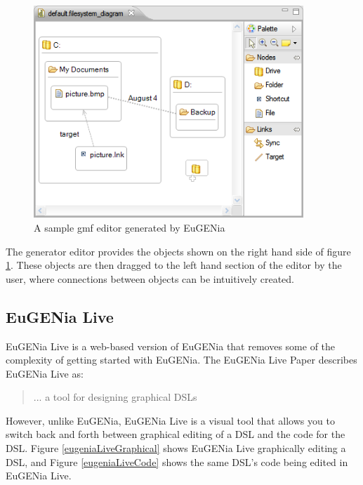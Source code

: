\begin{figure}
\begin{center}
	\includegraphics[width=4in]{figures/gmfeditor.png}
\end{center}
\caption{A sample gmf editor generated by EuGENia \citep{eugeniaSite}}
\label{sampleGmf}
\end{figure}

The generator editor provides the objects shown on the right hand side of figure \ref{sampleGmf}. These objects are then dragged to the left hand section of the editor by the user, where connections between objects can be intuitively created. 

\subsection{EuGENia Live}

EuGENia Live is a web-based version of EuGENia that removes some of the complexity of getting started with EuGENia. The EuGENia Live Paper \citep{eugeniaLivePaper} describes EuGENia Live as: \begin{quote}... a tool for designing graphical DSLs  \end{quote}

However, unlike EuGENia, EuGENia  Live is a visual tool that allows you to switch back and forth between graphical editing of a DSL and the code for the DSL. Figure \ref{eugeniaLiveGraphical} shows EuGENia Live graphically editing a DSL, and Figure \ref{eugeniaLiveCode} shows the same DSL's code being edited in EuGENia Live.


